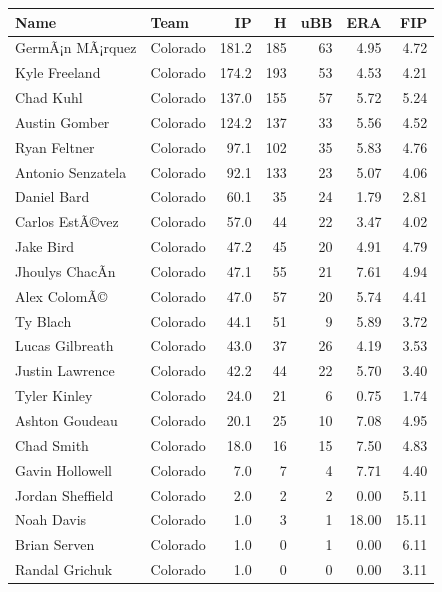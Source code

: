 \documentclass[
  11pt,
]{book}
\theoremstyle{definition}
\theoremstyle{definition}
\theoremstyle{definition}
\theoremstyle{definition}
\theoremstyle{remark}
\begin{document}
\begin{tabular}{llrrrrr}
\toprule
Name & Team & IP & H & uBB & ERA & FIP\\
\midrule
GermÃ¡n MÃ¡rquez & Colorado & 181.2 & 185 & 63 & 4.95 & 4.72\\
Kyle Freeland & Colorado & 174.2 & 193 & 53 & 4.53 & 4.21\\
Chad Kuhl & Colorado & 137.0 & 155 & 57 & 5.72 & 5.24\\
Austin Gomber & Colorado & 124.2 & 137 & 33 & 5.56 & 4.52\\
Ryan Feltner & Colorado & 97.1 & 102 & 35 & 5.83 & 4.76\\
\addlinespace
Antonio Senzatela & Colorado & 92.1 & 133 & 23 & 5.07 & 4.06\\
Daniel Bard & Colorado & 60.1 & 35 & 24 & 1.79 & 2.81\\
Carlos EstÃ©vez & Colorado & 57.0 & 44 & 22 & 3.47 & 4.02\\
Jake Bird & Colorado & 47.2 & 45 & 20 & 4.91 & 4.79\\
Jhoulys ChacÃ­n & Colorado & 47.1 & 55 & 21 & 7.61 & 4.94\\
\addlinespace
Alex ColomÃ© & Colorado & 47.0 & 57 & 20 & 5.74 & 4.41\\
Ty Blach & Colorado & 44.1 & 51 & 9 & 5.89 & 3.72\\
Lucas Gilbreath & Colorado & 43.0 & 37 & 26 & 4.19 & 3.53\\
Justin Lawrence & Colorado & 42.2 & 44 & 22 & 5.70 & 3.40\\
Tyler Kinley & Colorado & 24.0 & 21 & 6 & 0.75 & 1.74\\
\addlinespace
Ashton Goudeau & Colorado & 20.1 & 25 & 10 & 7.08 & 4.95\\
Chad Smith & Colorado & 18.0 & 16 & 15 & 7.50 & 4.83\\
Gavin Hollowell & Colorado & 7.0 & 7 & 4 & 7.71 & 4.40\\
Jordan Sheffield & Colorado & 2.0 & 2 & 2 & 0.00 & 5.11\\
Noah Davis & Colorado & 1.0 & 3 & 1 & 18.00 & 15.11\\
\addlinespace
Brian Serven & Colorado & 1.0 & 0 & 1 & 0.00 & 6.11\\
Randal Grichuk & Colorado & 1.0 & 0 & 0 & 0.00 & 3.11\\
\bottomrule
\end{tabular}

\newpage
\end{document}
